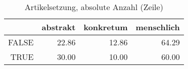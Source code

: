 \begin{table}[ht]
\centering
\begin{tabular}{rrrr}
  \hline
 & abstrakt & konkretum & menschlich \\ 
  \hline
FALSE & 22.86 & 12.86 & 64.29 \\ 
  TRUE & 30.00 & 10.00 & 60.00 \\ 
   \hline
\end{tabular}
\caption{Artikelsetzung, absolute Anzahl (Zeile)} 
\end{table}
